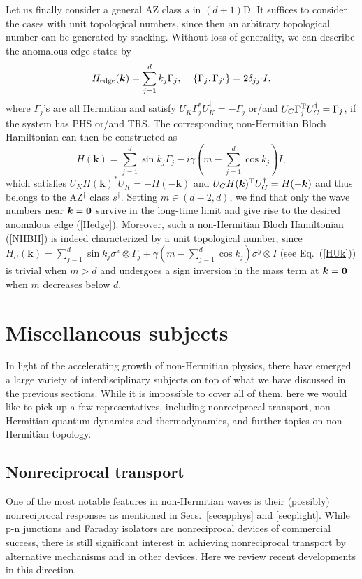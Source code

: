 \documentclass{tADP2e}
\theoremstyle{plain}
\theoremstyle{plain}
\theoremstyle{definition}
\begin{document}
Let us finally consider a general AZ class $s$ in $(d+1)$D. It suffices to consider the cases with unit topological numbers, since then an arbitrary topological number can be generated by stacking. Without loss of generality, 
we can describe the anomalous edge states by 
\begin{equation}
H_{\rm edge}(\boldsymbol{k})=\sum^d_{j=1}k_j\Gamma_j,\;\;\;\;\{\Gamma_j,\Gamma_{j'}\}=2\delta_{jj'}I,
\label{Hedge}
\end{equation}
where $\Gamma_j$'s are all Hermitian and satisfy $U_K\Gamma_j^* U_K^\dag=-\Gamma_j$ or/and $U_C\Gamma_j^{\rm T} U_C^\dag=\Gamma_j$, if the system has PHS or/and  TRS. The corresponding non-Hermitian Bloch Hamiltonian can then be constructed as
\begin{equation}
H(\boldsymbol{k})=\sum^d_{j=1}\sin k_j\Gamma_j-i\gamma\left(m-\sum^d_{j=1}\cos k_j\right)I,
\label{NHBH}
\end{equation}
which satisfies $U_KH(\boldsymbol{k})^*U_K^\dag=-H(-\boldsymbol{k})$ and $U_CH(\boldsymbol{k})^{\rm T}U_C^\dag=H(-\boldsymbol{k})$ and thus belongs to the AZ$^\dag$ class $s^\dag$. Setting $m\in(d-2,d)$, we find that only the wave numbers near $\boldsymbol{k}=\bold{0}$ survive in the long-time limit and give rise to the desired anomalous edge (\ref{Hedge}). Moreover, such a non-Hermitian Bloch Hamiltonian (\ref{NHBH}) is indeed characterized by a unit topological number, since $H_U(\boldsymbol{k})=\sum^d_{j=1}\sin k_j\sigma^x\otimes\Gamma_j+\gamma\left(m-\sum^d_{j=1}\cos k_j\right)\sigma^y\otimes I$ (see Eq.~(\ref{HUk})) is trivial when $m>d$ and undergoes a sign inversion in the mass term at $\boldsymbol{k}=\bold{0}$ when $m$ decreases below $d$. 

\section{Miscellaneous subjects\label{sec6}}
In light of the accelerating growth of non-Hermitian physics, there have emerged a large variety of interdisciplinary subjects on top of what we have discussed in the previous sections. While it is impossible to cover all of them, here we would like to pick up a few representatives, including nonreciprocal transport, non-Hermitian quantum dynamics and thermodynamics, and further topics on non-Hermitian topology.

\subsection{Nonreciprocal transport\label{sec:6np}}
One of the most notable features in non-Hermitian waves is their (possibly) nonreciprocal responses as mentioned in Secs.~\ref{secepphys} and \ref{secplight}. While p-n junctions and Faraday isolators are  nonreciprocal devices of commercial success, there is still significant interest in achieving nonreciprocal transport by alternative mechanisms and in other devices. Here we review recent developments in this direction.
\end{document}
